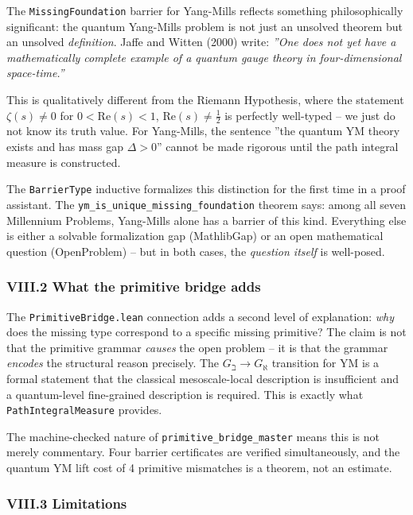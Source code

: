 \documentclass[12pt,a4paper]{article}
\begin{document}
The \texttt{MissingFoundation} barrier for Yang-Mills reflects something philosophically significant: the quantum Yang-Mills problem is not just an unsolved theorem but an unsolved \emph{definition}. Jaffe and Witten (2000) write: \emph{''One does not yet have a mathematically complete example of a quantum gauge theory in four-dimensional space-time.''}

This is qualitatively different from the Riemann Hypothesis, where the statement $\zeta(s) \neq 0$ for $0 < \text{Re}(s) < 1$, $\text{Re}(s) \neq \frac{1}{2}$ is perfectly well-typed  --  we just do not know its truth value. For Yang-Mills, the sentence ''the quantum YM theory exists and has mass gap $\Delta > 0$'' cannot be made rigorous until the path integral measure is constructed.

The \texttt{BarrierType} inductive formalizes this distinction for the first time in a proof assistant. The \texttt{ym\_is\_unique\_missing\_foundation} theorem says: among all seven Millennium Problems, Yang-Mills alone has a barrier of this kind. Everything else is either a solvable formalization gap (MathlibGap) or an open mathematical question (OpenProblem)  --  but in both cases, the \emph{question itself} is well-posed.

\subsubsection{VIII.2 What the primitive bridge adds}

The \texttt{PrimitiveBridge.lean} connection adds a second level of explanation: \emph{why} does the missing type correspond to a specific missing primitive? The claim is not that the primitive grammar \emph{causes} the open problem  --  it is that the grammar \emph{encodes} the structural reason precisely. The $G_{\beth} \to G_{\aleph}$ transition for YM is a formal statement that the classical mesoscale-local description is insufficient and a quantum-level fine-grained description is required. This is exactly what \texttt{PathIntegralMeasure} provides.

The machine-checked nature of \texttt{primitive\_bridge\_master} means this is not merely commentary. Four barrier certificates are verified simultaneously, and the quantum YM lift cost of 4 primitive mismatches is a theorem, not an estimate.

\subsubsection{VIII.3 Limitations}
\end{document}
